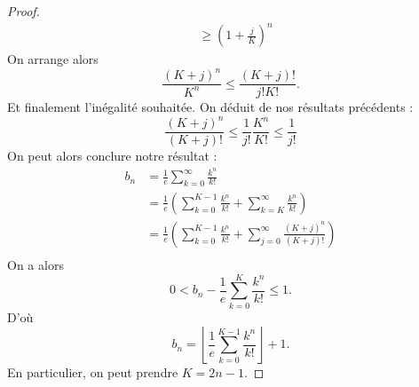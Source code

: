 \documentclass[../main.tex]{subfiles}
\begin{document}
\begin{proof}
\begin{align}
        &\ge \left(1+\frac{j}{K}\right)^n
    \end{align}
    On arrange alors
    \begin{equation}
        \frac{(K+j)^n}{K^n} \le \frac{(K+j)!}{j!K!}.
    \end{equation}
    Et finalement l'inégalité souhaitée. On déduit de nos résultats précédents :
    \begin{equation}
        \frac{(K+j)^n}{(K+j)!}\le \frac{1}{j!}\frac{K^n}{K!} \le \frac{1}{j!}
    \end{equation} On peut alors conclure notre résultat :
    \begin{align}
        b_n &= \frac{1}{e}\sum_{k=0}^\infty \frac{k^n}{k!}\\
        & = \frac{1}{e}\left(\sum_{k=0}^{K-1}\frac{k^n}{k!} + \sum_{k=K}^\infty \frac{k^n}{k!}\right)\\
        & = \frac{1}{e}\left(\sum_{k=0}^{K-1}\frac{k^n}{k!}+ \sum_{j=0}^\infty \frac{(K+j)^n}{(K+j)!}\right)\\
    \end{align}
    On a alors
    \begin{equation}
        0 < b_n - \frac{1}{e}\sum_{k=0}^{K}\frac{k^n}{k!} \le 1.
    \end{equation}
    D'où 
    \begin{equation}
        b_n = \left\lfloor\frac{1}{e}\sum_{k=0}^{K-1}\frac{k^n}{k!}\right\rfloor + 1.
    \end{equation}
    En particulier, on peut prendre \(K=2n-1\).
\end{proof}
\end{document}
